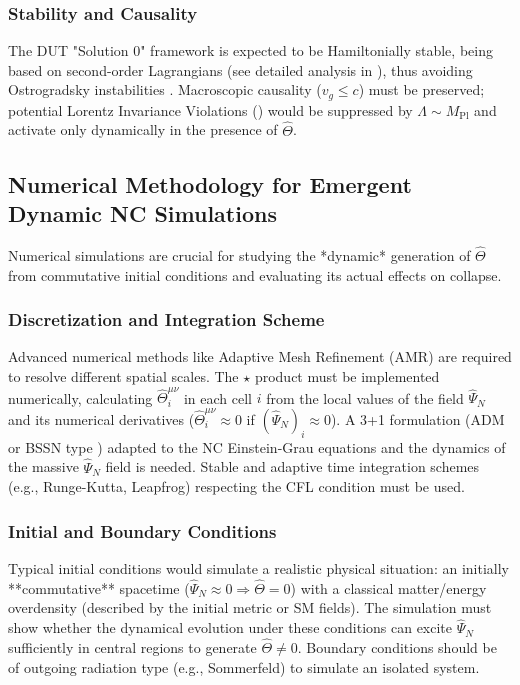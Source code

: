 \documentclass[11pt, a4paper]{article}
\theoremstyle{remark}
\newcommand{\Op}[1]{\hat{#1}}
\newcommand{\Mpl}{M_{\mathrm{Pl}}}
\begin{document}
\subsubsection{Stability and Causality}
\label{ssubsec:stability_causality_collapse}
The DUT "Solution 0" framework is expected to be Hamiltonially stable, being based on second-order Lagrangians (see detailed analysis in ), thus avoiding Ostrogradsky instabilities \citep{OstrogradskiRef, Woodard:2014wia}. Macroscopic causality (\( v_g \le c \)) must be preserved; potential Lorentz Invariance Violations () would be suppressed by \( \Lambda \sim \Mpl \) and activate only dynamically in the presence of \( \Op{\Theta} \).

\subsection{Numerical Methodology for Emergent Dynamic NC Simulations}
\label{subsec:collapse_numerics}

Numerical simulations are crucial for studying the *dynamic* generation of \( \Op{\Theta} \) from commutative initial conditions and evaluating its actual effects on collapse.

\subsubsection{Discretization and Integration Scheme}
\label{ssubsec:discretization_scheme}
Advanced numerical methods like Adaptive Mesh Refinement (AMR) are required to resolve different spatial scales. The \( \star \) product must be implemented numerically, calculating \( \Op{\Theta}^{\mu\nu}_i \) in each cell \( i \) from the local values of the field \( \Op{\Psi}_N \) and its numerical derivatives (\(\Op{\Theta}^{\mu\nu}_i \approx 0\) if \((\Op{\Psi}_N)_i \approx 0\)). A 3+1 formulation (ADM or BSSN type \citep{HenneauxTeitelboim1992}) adapted to the NC Einstein-Grau equations and the dynamics of the massive \( \Op{\Psi}_N \) field is needed. Stable and adaptive time integration schemes (e.g., Runge-Kutta, Leapfrog) respecting the CFL condition must be used.

\subsubsection{Initial and Boundary Conditions}
\label{ssubsec:initial_boundary_conditions}
Typical initial conditions would simulate a realistic physical situation: an initially **commutative** spacetime (\( \Op{\Psi}_N \approx 0 \Rightarrow \Op{\Theta} = 0 \)) with a classical matter/energy overdensity (described by the initial metric or SM fields). The simulation must show whether the dynamical evolution under these conditions can excite \( \Op{\Psi}_N \) sufficiently in central regions to generate \( \Op{\Theta} \neq 0 \). Boundary conditions should be of outgoing radiation type (e.g., Sommerfeld) to simulate an isolated system.
\end{document}
